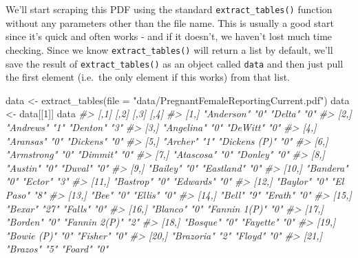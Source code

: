 \documentclass[
]{krantz}
\makeatletter
\newenvironment{Shaded}{\begin{snugshade}}{\end{snugshade}}
\newcommand{\AttributeTok}[1]{\textcolor[rgb]{0.61,0.61,0.61}{#1}}
\newcommand{\CommentTok}[1]{\textcolor[rgb]{0.37,0.37,0.37}{\textit{#1}}}
\newcommand{\DecValTok}[1]{\textcolor[rgb]{0.06,0.06,0.06}{#1}}
\newcommand{\FunctionTok}[1]{\textcolor[rgb]{0,0,0}{#1}}
\newcommand{\NormalTok}[1]{#1}
\newcommand{\OtherTok}[1]{\textcolor[rgb]{0.37,0.37,0.37}{#1}}
\newcommand{\StringTok}[1]{\textcolor[rgb]{0.5,0.5,0.5}{#1}}
\newenvironment{kframe}{%
\medskip{}
\setlength{\fboxsep}{.8em}
 \def\at@end@of@kframe{}%
 \ifinner\ifhmode%
  \def\at@end@of@kframe{\end{minipage}}%
  \begin{minipage}{\columnwidth}%
 \fi\fi%
 \def\FrameCommand##1{\hskip\@totalleftmargin \hskip-\fboxsep
 \colorbox{shadecolor}{##1}\hskip-\fboxsep
     \hskip-\linewidth \hskip-\@totalleftmargin \hskip\columnwidth}%
 \MakeFramed {\advance\hsize-\width
   \@totalleftmargin\z@ \linewidth\hsize
   \@setminipage}}%
 {\par\unskip\endMakeFramed%
 \at@end@of@kframe}
\renewenvironment{Shaded}{\begin{kframe}}{\end{kframe}}
\makeatother
\begin{document}
We'll start scraping this PDF using the standard \texttt{extract\_tables()} function without any parameters other than the file name. This is usually a good start since it's quick and often works - and if it doesn't, we haven't lost much time checking. Since we know \texttt{extract\_tables()} will return a list by default, we'll save the result of \texttt{extract\_tables()} as an object called \texttt{data} and then just pull the first element (i.e.~the only element if this works) from that list.

\begin{Shaded}
\begin{Highlighting}[]
\NormalTok{data }\OtherTok{\textless{}{-}} \FunctionTok{extract\_tables}\NormalTok{(}\AttributeTok{file =} \StringTok{"data/PregnantFemaleReportingCurrent.pdf"}\NormalTok{)}
\NormalTok{data }\OtherTok{\textless{}{-}}\NormalTok{ data[[}\DecValTok{1}\NormalTok{]]}
\NormalTok{data}
\CommentTok{\#\textgreater{}       [,1]            [,2] [,3]          [,4]}
\CommentTok{\#\textgreater{}  [1,] "Anderson"      "0"  "Delta"       "0" }
\CommentTok{\#\textgreater{}  [2,] "Andrews"       "1"  "Denton"      "3" }
\CommentTok{\#\textgreater{}  [3,] "Angelina"      "0"  "DeWitt"      "0" }
\CommentTok{\#\textgreater{}  [4,] "Aransas"       "0"  "Dickens"     "0" }
\CommentTok{\#\textgreater{}  [5,] "Archer"        "1"  "Dickens (P)" "0" }
\CommentTok{\#\textgreater{}  [6,] "Armstrong"     "0"  "Dimmit"      "0" }
\CommentTok{\#\textgreater{}  [7,] "Atascosa"      "0"  "Donley"      "0" }
\CommentTok{\#\textgreater{}  [8,] "Austin"        "0"  "Duval"       "0" }
\CommentTok{\#\textgreater{}  [9,] "Bailey"        "0"  "Eastland"    "0" }
\CommentTok{\#\textgreater{} [10,] "Bandera"       "0"  "Ector"       "3" }
\CommentTok{\#\textgreater{} [11,] "Bastrop"       "0"  "Edwards"     "0" }
\CommentTok{\#\textgreater{} [12,] "Baylor"        "0"  "El Paso"     "8" }
\CommentTok{\#\textgreater{} [13,] "Bee"           "0"  "Ellis"       "0" }
\CommentTok{\#\textgreater{} [14,] "Bell"          "9"  "Erath"       "0" }
\CommentTok{\#\textgreater{} [15,] "Bexar"         "27" "Falls"       "0" }
\CommentTok{\#\textgreater{} [16,] "Blanco"        "0"  "Fannin 1(P)" "0" }
\CommentTok{\#\textgreater{} [17,] "Borden"        "0"  "Fannin 2(P)" "2" }
\CommentTok{\#\textgreater{} [18,] "Bosque"        "0"  "Fayette"     "0" }
\CommentTok{\#\textgreater{} [19,] "Bowie (P)"     "0"  "Fisher"      "0" }
\CommentTok{\#\textgreater{} [20,] "Brazoria"      "2"  "Floyd"       "0" }
\CommentTok{\#\textgreater{} [21,] "Brazos"        "5"  "Foard"       "0" }

\end{Highlighting}
\end{Shaded}
\end{document}
